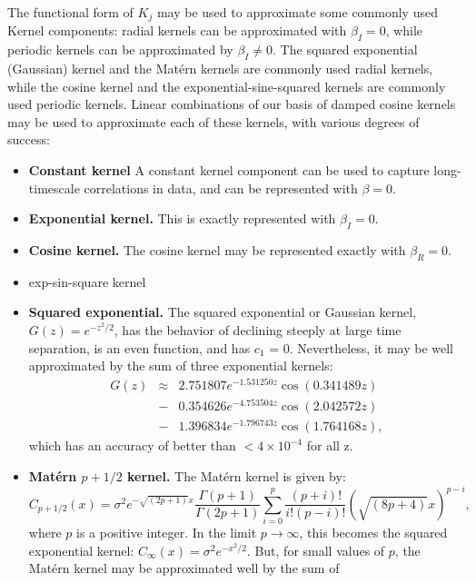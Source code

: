 \documentclass[manuscript, letterpaper]{aastex6}
\begin{document}
The functional form of $K_j$ may be used to approximate some commonly used Kernel components: radial
kernels can be approximated with $\beta_I=0$, while periodic kernels can be approximated by
$\beta_I \ne 0$.  The squared exponential (Gaussian) kernel and the Mat\'ern kernels are commonly
used radial kernels, while the cosine kernel and the exponential-sine-squared kernels are
commonly used periodic kernels.  Linear combinations of our basis of damped cosine kernels may be 
used to approximate each of these kernels, with various degrees of success:
\begin{itemize}
\item {\bf Constant kernel} A constant kernel component can be used to capture long-timescale
correlations in data, and can be represented with $\beta =  0$.
\item {\bf Exponential kernel.} This is exactly
represented with $\beta_I=0$.
\item {\bf Cosine kernel.} The cosine kernel may be represented exactly with $\beta_R=0$.
\item exp-sin-square kernel
\item {\bf Squared exponential.} The squared exponential or Gaussian kernel, $G(z)=e^{-z^2/2}$,
has the behavior of declining steeply at large time separation, is an even function, and has $c_1$ = 0.
Nevertheless, it may be well approximated by the sum of three exponential kernels:
\begin{eqnarray}
G(z) &\approx& 2.751807 e^{-1.531250 z} \cos{(0.341489 z)} \\
 &-& 0.354626 e^{-4.753504 z} \cos{(2.042572 z)}\\
 &-& 1.396834 e^{-1.796743 z} \cos{(1.764168 z)},
\end{eqnarray}
which has an accuracy of better than $<4\times 10^{-4}$ for all z.
\item {\bf Mat\'ern $p+1/2$ kernel.}  The Mat\'ern kernel is given by:
\begin{equation}
C_{p+1/2}(x) = \sigma^2 e^{-\sqrt{(2p+1)}x} \frac{\Gamma(p+1)}{\Gamma(2p+1)}
\sum_{i=0}^p \frac{(p+i)!}{i!(p-i)!} (\sqrt{(8p+4)}x)^{p-i},
\end{equation} 
where $p$ is a positive integer.  In the limit $p\rightarrow \infty$, this becomes the
squared exponential kernel: $C_\infty(x) = \sigma^2 e^{-x^2/2}$.  But, for small
values of $p$, the Mat\'ern kernel may be approximated well by the sum of

\end{itemize}
\end{document}

